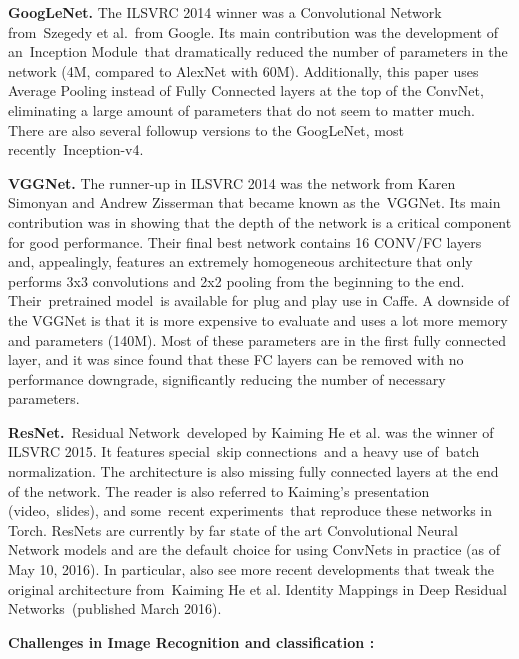 \documentclass{article} %
\begin{document}
\noindent \textbf{GoogLeNet.} The ILSVRC 2014 winner was a Convolutional Network from~Szegedy et al.~from Google. Its main contribution was the development of an~Inception Module~that dramatically reduced the number of parameters in the network (4M, compared to AlexNet with 60M). Additionally, this paper uses Average Pooling instead of Fully Connected layers at the top of the ConvNet, eliminating a large amount of parameters that do not seem to matter much. There are also several followup versions to the GoogLeNet, most recently~Inception-v4.

\noindent \textbf{VGGNet.} The runner-up in ILSVRC 2014 was the network from Karen Simonyan and Andrew Zisserman that became known as the~VGGNet. Its main contribution was in showing that the depth of the network is a critical component for good performance. Their final best network contains 16 CONV/FC layers and, appealingly, features an extremely homogeneous architecture that only performs 3x3 convolutions and 2x2 pooling from the beginning to the end. Their~pretrained model~is available for plug and play use in Caffe. A downside of the VGGNet is that it is more expensive to evaluate and uses a lot more memory and parameters (140M). Most of these parameters are in the first fully connected layer, and it was since found that these FC layers can be removed with no performance downgrade, significantly reducing the number of necessary parameters.

\noindent \textbf{ResNet.}~Residual Network~developed by Kaiming He et al. was the winner of ILSVRC 2015. It features special~skip connections~and a heavy use of~batch normalization. The architecture is also missing fully connected layers at the end of the network. The reader is also referred to Kaiming's presentation (video,~slides), and some~recent experiments~that reproduce these networks in Torch. ResNets are currently by far state of the art Convolutional Neural Network models and are the default choice for using ConvNets in practice (as of May 10, 2016). In particular, also see more recent developments that tweak the original architecture from~Kaiming He et al. Identity Mappings in Deep Residual Networks~(published March 2016).

\noindent 

\noindent 

\noindent 

\noindent 

\noindent 

\noindent 

\noindent \textbf{ Challenges in Image Recognition and classification :}
\end{document}
